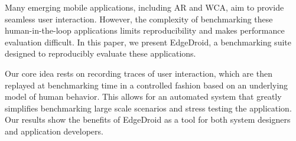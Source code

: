 
Many emerging mobile applications, including \acf{AR} and \acf{WCA}, aim to provide seamless user interaction. 
However, the complexity of benchmarking these human-in-the-loop applications limits reproducibility and makes performance evaluation difficult. In this paper, we present EdgeDroid, a benchmarking suite designed to reproducibly evaluate these applications.

Our core idea rests on recording traces of user interaction, which are then replayed at benchmarking time in a controlled fashion based on an underlying model of human behavior. 
This allows for an automated system that greatly simplifies benchmarking large scale scenarios and stress testing the application.
Our results show the benefits of EdgeDroid as a tool for both system designers and application developers.
